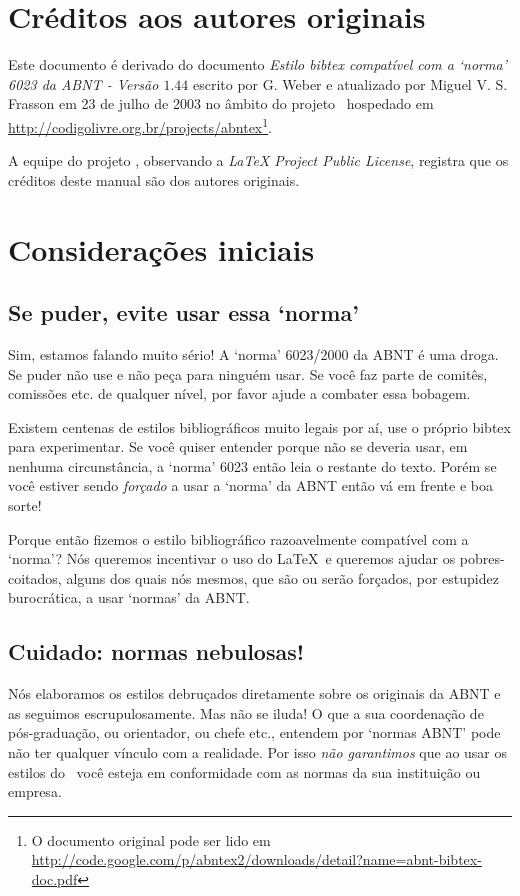 \documentclass[a4paper]{ltxdoc}
\begin{document}
\section{Créditos aos autores originais}

Este documento é derivado do documento \emph{Estilo bibtex compatível com a
`norma' 6023 da ABNT - Versão $ 1.44 $} escrito por G. Weber e atualizado por
Miguel V. S. Frasson em 23 de julho de 2003 no âmbito do projeto \abnTeX\
hospedado em \url{http://codigolivre.org.br/projects/abntex}\footnote{O documento original
pode ser lido em
\url{http://code.google.com/p/abntex2/downloads/detail?name=abnt-bibtex-doc.pdf}}.

A equipe do projeto , observando a \emph{LaTeX Project Public License},
registra que os créditos deste manual são dos autores originais.

\section{Considerações iniciais}

\subsection{Se puder, evite usar essa `norma'}

Sim, estamos falando muito sério! A `norma' 6023/2000\cite{NBR6023:2000} da ABNT
é uma droga. Se puder não use e não peça para ninguém usar. Se você faz parte de
comitês, comissões etc. de qualquer nível, por favor ajude a combater essa
bobagem.

Existem centenas de estilos bibliográficos muito legais por aí, use o próprio
\textsf{bibtex} para experimentar. Se você quiser entender porque não se deveria
usar, em nenhuma circunstância, a `norma' 6023 então leia o restante do texto.
Porém se você estiver sendo \emph{forçado} a usar a `norma' da ABNT então vá em
frente e boa sorte!

Porque então fizemos o estilo bibliográfico razoavelmente compatível
com a `norma'? Nós queremos incentivar o uso do \LaTeX\  e queremos
ajudar os pobres-coitados, alguns dos quais nós mesmos, que são ou
serão forçados, por estupidez burocrática, a usar `normas' da ABNT.

\subsection{Cuidado: normas nebulosas!}

Nós elaboramos os estilos debruçados diretamente sobre os originais da ABNT
e as seguimos escrupulosamente. Mas não se iluda! O que a sua coordenação
de pós-graduação, ou orientador, ou chefe etc., entendem por `normas ABNT'
pode não ter qualquer vínculo com a realidade. Por isso \emph{não garantimos}
que ao usar os estilos do \abnTeX\ você esteja em conformidade com as normas
da sua instituição ou empresa.
\end{document}
